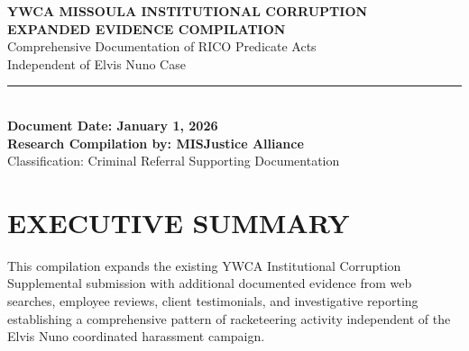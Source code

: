 \documentclass[11pt,letterpaper]{article}
\begin{document}
\thispagestyle{firstpage}

\begin{center}
{\fontsize{20}{24}\selectfont\bfseries\color{NavyBlue}YWCA MISSOULA INSTITUTIONAL CORRUPTION}\\[6pt]
{\fontsize{14}{18}\selectfont\bfseries\color{NavyBlue}EXPANDED EVIDENCE COMPILATION}\\[10pt]
{\large Comprehensive Documentation of RICO Predicate Acts}\\[4pt]
{\large Independent of Elvis Nuno Case}\\[16pt]
\textcolor{Gold}{\rule{4in}{1.5pt}}\\[14pt]
{\large\bfseries Document Date: January 1, 2026}\\[4pt]
{\large\bfseries Research Compilation by: MISJustice Alliance}\\[4pt]
{\large Classification: \textcolor{alertred}{Criminal Referral Supporting Documentation}}
\end{center}

\vspace{0.2in}

\begin{center}
\end{center}

\vspace{0.3in}

\tableofcontents
\newpage

\section{EXECUTIVE SUMMARY}

This compilation expands the existing YWCA Institutional Corruption Supplemental submission with additional documented evidence from web searches, employee reviews, client testimonials, and investigative reporting establishing a comprehensive pattern of racketeering activity independent of the Elvis Nuno coordinated harassment campaign.
\end{document}
